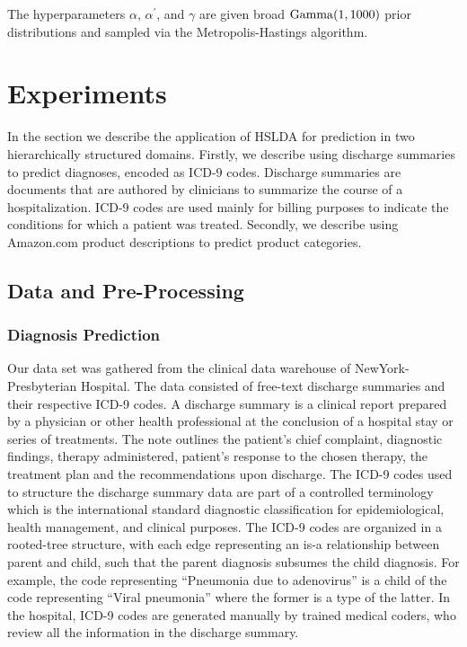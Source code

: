 \documentclass{article}
\begin{document}
The hyperparameters $\alpha$, $\alpha^{\prime}$, and $\gamma$ are
given broad ${\rm Gamma}(1,1000)$ prior distributions and sampled
via the Metropolis-Hastings algorithm. 


\section{Experiments}

\label{sec:experiments}

In the section we describe the application of HSLDA for prediction
in two hierarchically structured domains. Firstly, we describe using
discharge summaries to predict diagnoses, encoded as ICD-9 codes.
Discharge summaries are documents that are authored by clinicians
to summarize the course of a hospitalization. ICD-9 codes are used
mainly for billing purposes to indicate the conditions for which a
patient was treated. Secondly, we describe using Amazon.com product
descriptions to predict product categories.


\subsection{Data and Pre-Processing}


\subsubsection{Diagnosis Prediction}

Our data set was gathered from the clinical data warehouse of NewYork-Presbyterian
Hospital. The data consisted of free-text discharge summaries and
their respective ICD-9 codes. A discharge summary is a clinical report
prepared by a physician or other health professional at the conclusion
of a hospital stay or series of treatments. The note outlines the
patient's chief complaint, diagnostic findings, therapy administered,
patient's response to the chosen therapy, the treatment plan and the
recommendations upon discharge. The ICD-9 codes used to structure
the discharge summary data are part of a controlled terminology which
is the international standard diagnostic classification for epidemiological,
health management, and clinical purposes. The ICD-9 codes are organized
in a rooted-tree structure, with each edge representing an is-a relationship
between parent and child, such that the parent diagnosis subsumes
the child diagnosis. For example, the code representing {}``Pneumonia
due to adenovirus'' is a child of the code representing {}``Viral
pneumonia'' where the former is a type of the latter. In the hospital,
ICD-9 codes are generated manually by trained medical coders, who
review all the information in the discharge summary.
\end{document}
